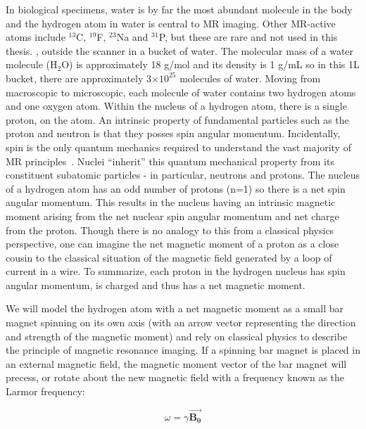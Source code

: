 In biological specimens, water is by far the most abundant molecule in the body and the hydrogen atom in water is central to MR imaging.
Other MR-active atoms include $^{13}$C, $^{19}$F, $^{23}$Na and $^{31}$P, but these are rare and not used in this thesis.
, outside the scanner in a bucket of water.
The molecular mass of a water molecule (H$_2$O) is approximately 18 g/mol and its density is 1 g/mL so in this 1L bucket, there are approximately 3$\times10^{25}$ molecules of water.
Moving from macroscopic to microscopic, each molecule of water contains two hydrogen atoms and one oxygen atom.
Within the nucleus of a hydrogen atom, there is a single proton,  on the atom.
An intrinsic property of fundamental particles such as the proton and neutron is that they posses spin angular momentum.
Incidentally, spin is the only quantum mechanics required to understand the vast majority of MR principles~\cite{Hanson:2008tp}.
Nuclei ``inherit'' this quantum mechanical property from its constituent subatomic particles - in particular, neutrons and protons.
The nucleus of a hydrogen atom has an odd number of protons (n=1) so there is a net spin angular momentum.
This results in the nucleus having an intrinsic magnetic moment arising from the net nuclear spin angular momentum and net charge from the proton.
Though there is no analogy to this from a classical physics perspective, one can imagine the net magnetic moment of a proton as a close cousin to the classical situation of the magnetic field generated by a loop of current in a wire.
To summarize, each proton in the hydrogen nucleus has spin angular momentum, is charged and thus has a net magnetic moment.

We will model the hydrogen atom with a net magnetic moment as a small bar magnet spinning on its own axis (with an arrow vector representing the direction and strength of the magnetic moment) and rely on classical physics to describe the principle of magnetic resonance imaging. 
If a spinning bar magnet is placed in an external magnetic field, the magnetic moment vector of the bar magnet will precess, or rotate about the new magnetic field with a frequency known as the Larmor frequency:

\begin{equation}
	\omega = \gamma \vec{\mathbf{B_0}}
\end{equation}

